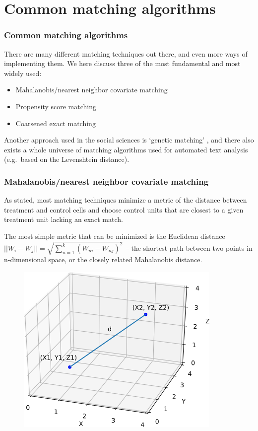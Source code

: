 \documentclass[12pt,english,dvipsnames,aspectratio=169,handout]{beamer}\usepackage[]{graphicx}\usepackage[]{xcolor}
\begin{document}
\section{Common matching algorithms}


\begin{frame}
  \frametitle{Common matching algorithms}
\footnotesize
There are many different matching techniques out there, and even more ways of implementing them. We here discuss three of the most fundamental and most widely used:

\begin{itemize}
\item Mahalanobis/nearest neighbor covariate matching
\item Propensity score matching
\item Coarsened exact matching
\end{itemize}

Another approach used in the social sciences is `genetic matching' \cite{diamond_genetic_2013}, and there also exists a whole universe of matching algorithms used for automated text analysis (e.g.\ based on the Levenshtein distance).
\end{frame}




\begin{frame}
  \frametitle{Mahalanobis/nearest neighbor covariate matching}
\footnotesize

As stated, most matching techniques minimize a metric of the distance between treatment and control cells and choose control units that are closest to a given treatment unit lacking an exact match.

The most simple metric that can be minimized is the Euclidean distance $||W_i - W_j||= \sqrt{\sum_{n=1}^{k} {(W_{ni}-W_{nj})}^2}$ -- the shortest path between two points in n-dimensional space, or the closely related Mahalanobis distance.

	 \begin{figure} 
    \includegraphics[height=.4\textheight,keepaspectratio=true]{../04-figures/06/01-euclidean}
    \end{figure}

\end{frame}
\end{document}

